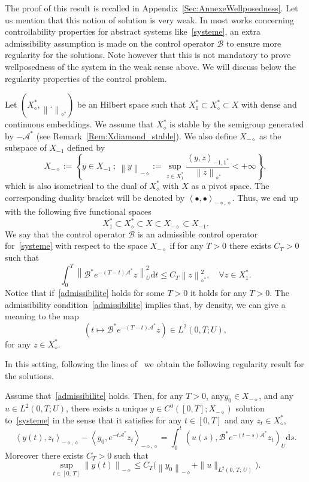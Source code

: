 \documentclass[10pt]{amsart}
\theoremstyle{definition}\newtheorem{defi}[theo]{Definition}\newtheorem{rema}[theo]{Remark}\newtheorem{exam}[theo]{Example}\newtheorem{exem}[theo]{Example}\newtheorem{nota}[theo]{Notation}
\newcommand\As{\mathcal{A}^*}
\newcommand\B{\mathcal{B}}
\newcommand\Bs{\mathcal{B}^*}
\newcommand{\Xuns}{X_1^*}
\newcommand{\Xmun}{X_{-1}}
\newcommand{\Xalphas}{X_\diamond^*}
\newcommand{\Xmalpha}{X_{-\diamond}}
\newcommand{\normeU}[1]{\left\| #1 \right\|_U}
\newcommand{\normeXalphas}[1]{\left\| #1 \right\|_{\diamond^*}}
\newcommand{\normeXmalpha}[1]{\left\| #1 \right\|_{-\diamond}}
\newcommand{\psU}[2]{\left(#1, #2 \right)_U}
\newcommand{\dual}[2]{\left\langle #1, #2 \right\rangle_{-\diamond,\diamond}}
\newcommand{\dualX}[2]{\left\langle #1, #2 \right\rangle_{-1,1^*}}
\newcommand{\md}{\mathrm{d}}
\renewcommand{\cdot}{{\scriptstyle \bullet}}
\let\oldforall\forall
\renewcommand*{\forall}{\mathrel{\oldforall}}
\begin{document}
The proof of this result is recalled in Appendix~\ref{Sec:AnnexeWellposedness}. Let us mention that this notion of solution is very weak. In most works concerning controllability properties for abstract systems like~\eqref{systeme}, an extra admissibility assumption is made on the control operator $\B$ to ensure more regularity for the solutions. Note however that this is not mandatory to prove wellposedness of the system in the weak sense above. We will discuss below the regularity properties of the control problem.

Let $(\Xalphas, \normeXalphas{.})$ be an Hilbert space such that $\Xuns \subset \Xalphas \subset X$ with dense and continuous embeddings. We assume that $\Xalphas$ is stable by the semigroup generated by $-\As$ (see Remark~\ref{Rem:Xdiamond_stable}). We also define $\Xmalpha$ as the subspace of $\Xmun$ defined by
\begin{equation*}\label{Def:X-alpha}
\Xmalpha := \left\{ y \in \Xmun \: ; \: \normeXmalpha{y} := \sup\limits_{z \in \Xuns} \frac{\dualX{y}{z}}{\normeXalphas{z}} < + \infty \right\},
\end{equation*}
which is also isometrical to the dual of $\Xalphas$ with $X$ as a pivot space. The corresponding duality bracket will be denoted by $\dual{\cdot}{\cdot}$. Thus, we end up with the following five functional spaces
\begin{equation*}\label{QuintupleDualite}
\Xuns \subset \Xalphas \subset X \subset \Xmalpha \subset \Xmun.
\end{equation*}
We say that the control operator $\B$ is an admissible control operator for~\eqref{systeme} with respect to the space $\Xmalpha$ if for any $T>0$ there exists $C_T >0$ such that
\begin{equation}\label{admissibilite}
\int_0^T \normeU{\Bs e^{-(T-t)\As} z}^2 \md t \leq C_T \normeXalphas{ z }^2, \quad \forall z \in \Xuns.
\end{equation}
Notice that if~\eqref{admissibilite} holds for some $T>0$ it holds for any $T>0$. The admissibility condition~\eqref{admissibilite} implies that, by density, we can give a meaning to the map
\[
\left(t \mapsto \Bs e^{-(T-t) \As} z \right) \in L^2(0,T ; U),
\]
for any $z\in \Xalphas$.

In this setting, following the lines of~\cite[Theorem~2.37]{CoronBook} we obtain the following regularity result for the solutions.

\begin{prop}\label{Prop:Wellposedness}
Assume that~\eqref{admissibilite} holds. Then, for any $T>0$, any\linebreak$y_0 \in \Xmalpha$, and any $u \in L^2(0,T ; U)$, there exists a unique $y \in C^0([0,T]; \Xmalpha)$ solution to~\eqref{systeme} in the sense that it satisfies for any $t \in [0,T]$ and any $z_t \in \Xalphas$,
\begin{equation*}\label{CaracterisationDualeSolutions}
\dual{y(t)}{z_t} - \dual{y_0}{e^{-t\As} z_t} = \int_0^t \psU{u(s)}{ \Bs e^{-(t-s) \As} z_t} \md s.
\end{equation*}
Moreover there exists $C_T>0$ such that
\[
\sup\limits_{t \in [0,\,T]} \normeXmalpha{y(t)} \leq C_T \big(\normeXmalpha{y_0} + \| u \|_{L^2(0,\,T;\,U)} \big).
\]
\end{prop}
\end{document}
